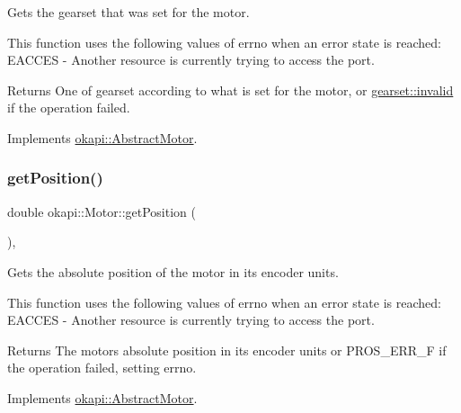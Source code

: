 Gets the gearset that was set for the motor.

This function uses the following values of errno when an error state is reached\+: E\+A\+C\+C\+ES -\/ Another resource is currently trying to access the port.

\begin{DoxyReturn}{Returns}
One of gearset according to what is set for the motor, or \mbox{\hyperlink{classokapi_1_1AbstractMotor_a88aaa6ea2fa10f5520a537bbf26774d5afedb2d84cafe20862cb4399751a8a7e3}{gearset\+::invalid}} if the operation failed. 
\end{DoxyReturn}


Implements \mbox{\hyperlink{classokapi_1_1AbstractMotor_adc90f1fc8af6c34c4e833355693474bb}{okapi\+::\+Abstract\+Motor}}.

\mbox{\label{classokapi_1_1Motor_a4592f8a1cce4474f85ceabd3d7e2fe0b}} 
\subsubsection{\texorpdfstring{getPosition()}{getPosition()}}
{\footnotesize\ttfamily double okapi\+::\+Motor\+::get\+Position (\begin{DoxyParamCaption}{ }\end{DoxyParamCaption})\hspace{0.3cm}{\ttfamily [override]}, {\ttfamily [virtual]}}

Gets the absolute position of the motor in its encoder units.

This function uses the following values of errno when an error state is reached\+: E\+A\+C\+C\+ES -\/ Another resource is currently trying to access the port.

\begin{DoxyReturn}{Returns}
The motor\textquotesingle{}s absolute position in its encoder units or P\+R\+O\+S\+\_\+\+E\+R\+R\+\_\+F if the operation failed, setting errno. 
\end{DoxyReturn}


Implements \mbox{\hyperlink{classokapi_1_1AbstractMotor_a4f9d74e054600c5ddb49ebb8164004d3}{okapi\+::\+Abstract\+Motor}}.

\mbox{\label{classokapi_1_1Motor_a992171c86829e52f5418988fada0b6fa}} 
